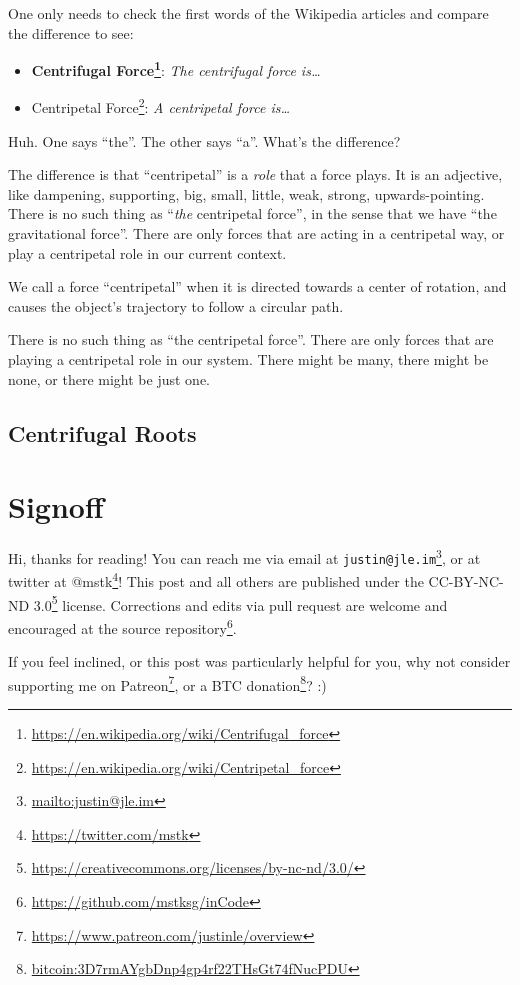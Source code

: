 \documentclass[]{article}
\renewcommand{\href}[2]{#2\footnote{\url{#1}}}
\begin{document}
One only needs to check the first words of the Wikipedia articles and compare
the difference to see:

\begin{itemize}
\tightlist
\item
  \textbf{\href{https://en.wikipedia.org/wiki/Centrifugal_force}{Centrifugal
  Force}}: \emph{The centrifugal force is\ldots{}}
\item
  \href{https://en.wikipedia.org/wiki/Centripetal_force}{Centripetal Force}:
  \emph{A centripetal force is\ldots{}}
\end{itemize}

Huh. One says ``the''. The other says ``a''. What's the difference?

The difference is that ``centripetal'' is a \emph{role} that a force plays. It
is an adjective, like dampening, supporting, big, small, little, weak, strong,
upwards-pointing. There is no such thing as ``\emph{the} centripetal force'', in
the sense that we have ``the gravitational force''. There are only forces that
are acting in a centripetal way, or play a centripetal role in our current
context.

We call a force ``centripetal'' when it is directed towards a center of
rotation, and causes the object's trajectory to follow a circular path.

There is no such thing as ``the centripetal force''. There are only forces that
are playing a centripetal role in our system. There might be many, there might
be none, or there might be just one.

\hypertarget{centrifugal-roots}{%
\subsection{Centrifugal Roots}\label{centrifugal-roots}}

\hypertarget{signoff}{%
\section{Signoff}\label{signoff}}

Hi, thanks for reading! You can reach me via email at
\href{mailto:justin@jle.im}{\nolinkurl{justin@jle.im}}, or at twitter at
\href{https://twitter.com/mstk}{@mstk}! This post and all others are published
under the \href{https://creativecommons.org/licenses/by-nc-nd/3.0/}{CC-BY-NC-ND
3.0} license. Corrections and edits via pull request are welcome and encouraged
at \href{https://github.com/mstksg/inCode}{the source repository}.

If you feel inclined, or this post was particularly helpful for you, why not
consider \href{https://www.patreon.com/justinle/overview}{supporting me on
Patreon}, or a \href{bitcoin:3D7rmAYgbDnp4gp4rf22THsGt74fNucPDU}{BTC donation}?
:)
\end{document}
